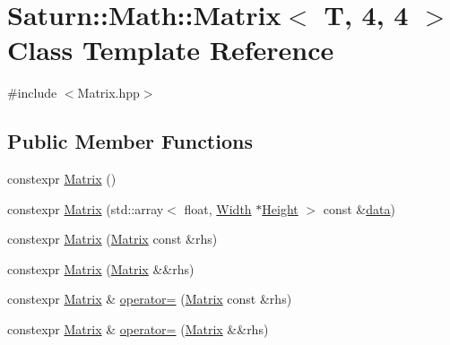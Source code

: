 \hypertarget{class_saturn_1_1_math_1_1_matrix_3_01_t_00_014_00_014_01_4}{}\section{Saturn\+:\+:Math\+:\+:Matrix$<$ T, 4, 4 $>$ Class Template Reference}
\label{class_saturn_1_1_math_1_1_matrix_3_01_t_00_014_00_014_01_4}


{\ttfamily \#include $<$Matrix.\+hpp$>$}

\subsection*{Public Member Functions}
\begin{DoxyCompactItemize}
\item 
constexpr \mbox{\hyperlink{class_saturn_1_1_math_1_1_matrix_3_01_t_00_014_00_014_01_4_aedf9012c4de47120d50e4cdb58659989}{Matrix}} ()
\item 
constexpr \mbox{\hyperlink{class_saturn_1_1_math_1_1_matrix_3_01_t_00_014_00_014_01_4_a3264fde5771e874754dda5831ea1fa64}{Matrix}} (std\+::array$<$ float, \mbox{\hyperlink{class_saturn_1_1_math_1_1_matrix_3_01_t_00_014_00_014_01_4_ae0e3e5c9ab2d8f43d74ef1485f2a46aa}{Width}} $\ast$\mbox{\hyperlink{class_saturn_1_1_math_1_1_matrix_3_01_t_00_014_00_014_01_4_a53f3e480546936c7c9d0fa0a6f8d8bda}{Height}} $>$ const \&\mbox{\hyperlink{glad_8h_a1848da31b3e095a7152c7cba8375936d}{data}})
\item 
constexpr \mbox{\hyperlink{class_saturn_1_1_math_1_1_matrix_3_01_t_00_014_00_014_01_4_adaba72b263afdbdd2d6f25d65864bfe5}{Matrix}} (\mbox{\hyperlink{class_saturn_1_1_math_1_1_matrix}{Matrix}} const \&rhs)
\item 
constexpr \mbox{\hyperlink{class_saturn_1_1_math_1_1_matrix_3_01_t_00_014_00_014_01_4_ad8927f9e88fbbd6bee4e5eaeae7a457a}{Matrix}} (\mbox{\hyperlink{class_saturn_1_1_math_1_1_matrix}{Matrix}} \&\&rhs)
\item 
constexpr \mbox{\hyperlink{class_saturn_1_1_math_1_1_matrix}{Matrix}} \& \mbox{\hyperlink{class_saturn_1_1_math_1_1_matrix_3_01_t_00_014_00_014_01_4_af1aeb88a8281139d07845e8412ea9115}{operator=}} (\mbox{\hyperlink{class_saturn_1_1_math_1_1_matrix}{Matrix}} const \&rhs)
\item 
constexpr \mbox{\hyperlink{class_saturn_1_1_math_1_1_matrix}{Matrix}} \& \mbox{\hyperlink{class_saturn_1_1_math_1_1_matrix_3_01_t_00_014_00_014_01_4_ae8a9f34a10f15e14aa79bccaad5e3fdf}{operator=}} (\mbox{\hyperlink{class_saturn_1_1_math_1_1_matrix}{Matrix}} \&\&rhs)

\end{DoxyCompactItemize}
